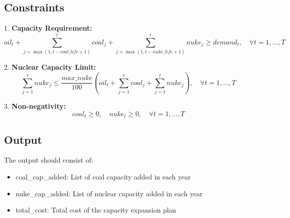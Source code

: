 \documentclass{article}
\begin{document}
\subsection*{Constraints}
1. \textbf{Capacity Requirement:}
   \[
   oil_t + \sum_{j=\max(1, t - coal\_life + 1)}^{t} coal_j + \sum_{j=\max(1, t - nuke\_life + 1)}^{t} nuke_j \geq demand_t, \quad \forall t = 1, \ldots, T
   \]
   
2. \textbf{Nuclear Capacity Limit:}
   \[
   \sum_{j=1}^{t} nuke_j \leq \frac{max\_nuke}{100} \left( oil_t + \sum_{j=1}^{t} coal_j + \sum_{j=1}^{t} nuke_j \right), \quad \forall t = 1, \ldots, T
   \]

3. \textbf{Non-negativity:}
   \[
   coal_t \geq 0, \quad nuke_t \geq 0, \quad \forall t = 1, \ldots, T
   \]

\subsection*{Output}
The output should consist of:
\begin{itemize}
    \item coal\_cap\_added: List of coal capacity added in each year
    \item nuke\_cap\_added: List of nuclear capacity added in each year
    \item total\_cost: Total cost of the capacity expansion plan
\end{itemize}
\end{document}
